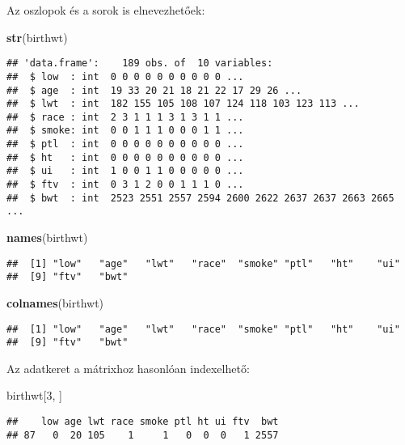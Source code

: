 \documentclass[]{book}
\newenvironment{Shaded}{\begin{snugshade}}{\end{snugshade}}
\newcommand{\DecValTok}[1]{\textcolor[rgb]{0.00,0.00,0.81}{#1}}
\newcommand{\KeywordTok}[1]{\textcolor[rgb]{0.13,0.29,0.53}{\textbf{#1}}}
\newcommand{\NormalTok}[1]{#1}
\begin{document}
Az oszlopok és a sorok is elnevezhetőek:

\begin{Shaded}
\begin{Highlighting}[]
\KeywordTok{str}\NormalTok{(birthwt)}
\end{Highlighting}
\end{Shaded}

\begin{verbatim}
## 'data.frame':    189 obs. of  10 variables:
##  $ low  : int  0 0 0 0 0 0 0 0 0 0 ...
##  $ age  : int  19 33 20 21 18 21 22 17 29 26 ...
##  $ lwt  : int  182 155 105 108 107 124 118 103 123 113 ...
##  $ race : int  2 3 1 1 1 3 1 3 1 1 ...
##  $ smoke: int  0 0 1 1 1 0 0 0 1 1 ...
##  $ ptl  : int  0 0 0 0 0 0 0 0 0 0 ...
##  $ ht   : int  0 0 0 0 0 0 0 0 0 0 ...
##  $ ui   : int  1 0 0 1 1 0 0 0 0 0 ...
##  $ ftv  : int  0 3 1 2 0 0 1 1 1 0 ...
##  $ bwt  : int  2523 2551 2557 2594 2600 2622 2637 2637 2663 2665 ...
\end{verbatim}

\begin{Shaded}
\begin{Highlighting}[]
\KeywordTok{names}\NormalTok{(birthwt)}
\end{Highlighting}
\end{Shaded}

\begin{verbatim}
##  [1] "low"   "age"   "lwt"   "race"  "smoke" "ptl"   "ht"    "ui"   
##  [9] "ftv"   "bwt"
\end{verbatim}

\begin{Shaded}
\begin{Highlighting}[]
\KeywordTok{colnames}\NormalTok{(birthwt)}
\end{Highlighting}
\end{Shaded}

\begin{verbatim}
##  [1] "low"   "age"   "lwt"   "race"  "smoke" "ptl"   "ht"    "ui"   
##  [9] "ftv"   "bwt"
\end{verbatim}

Az adatkeret a mátrixhoz hasonlóan indexelhető:

\begin{Shaded}
\begin{Highlighting}[]
\NormalTok{birthwt[}\DecValTok{3}\NormalTok{, ]}
\end{Highlighting}
\end{Shaded}

\begin{verbatim}
##    low age lwt race smoke ptl ht ui ftv  bwt
## 87   0  20 105    1     1   0  0  0   1 2557
\end{verbatim}
\end{document}
